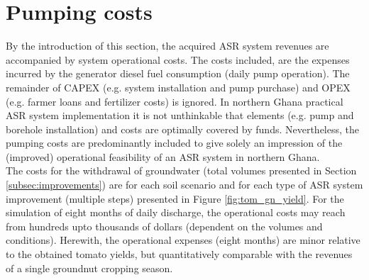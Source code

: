 %
%

\section{Pumping costs}
\label{section:pump_costs}
By the introduction of this section, the acquired ASR system revenues are accompanied by system operational costs. The costs included, are the expenses incurred by the generator diesel fuel consumption (daily pump operation). The remainder of CAPEX (e.g. system installation and pump purchase) and OPEX (e.g. farmer loans and fertilizer costs) is ignored. In northern Ghana practical ASR system implementation it is not unthinkable that elements (e.g. pump and borehole installation) and costs are optimally covered by funds. Nevertheless, the pumping costs are predominantly included to give solely an impression of the (improved) operational feasibility of an ASR system in northern Ghana. \\

The costs for the withdrawal of groundwater (total volumes presented in Section \ref{subsec:improvements}) are for each soil scenario and for each type of ASR system improvement (multiple steps) presented in Figure \ref{fig:tom_gn_yield}. For the simulation of eight months of daily discharge, the operational costs may reach from hundreds upto thousands of dollars (dependent on the volumes and conditions). Herewith, the operational expenses (eight months) are minor relative to the obtained tomato yields, but quantitatively comparable with the revenues of a single groundnut cropping season. 

